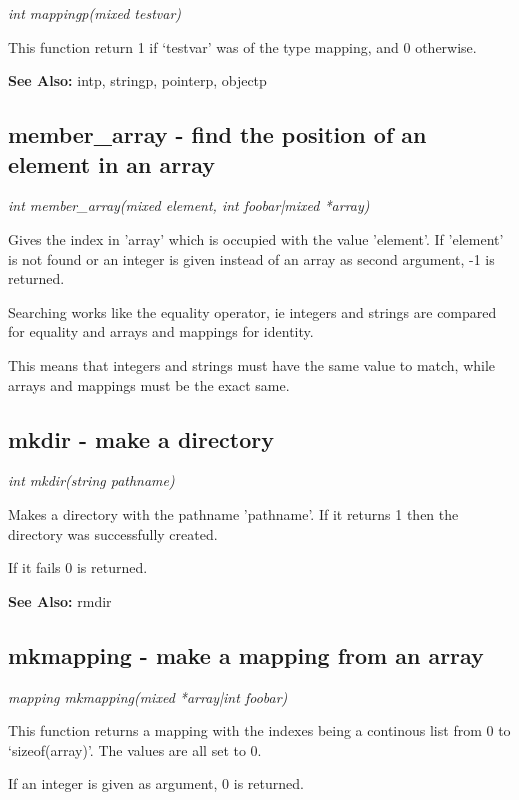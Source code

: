     {\em int mappingp(mixed testvar)}

    This function return 1 if `testvar' was of the type mapping,
    and 0 otherwise.

    {\bf See Also: }    intp, stringp, pointerp, objectp



\subsection{member\_array - find the position of an element in an array}

    {\em int member\_array(mixed element, int foobar|mixed *array)}

    Gives the index in 'array' which is occupied with the value 'element'.
    If 'element' is not found or an integer is given instead of an array
    as second argument, -1 is returned.

    Searching works like the equality operator, ie integers and strings
    are compared for equality and arrays and mappings for identity.

    This means that integers and strings must have the same value to match,
    while arrays and mappings must be the exact same.



\subsection{mkdir - make a directory}

    {\em int mkdir(string pathname)}

    Makes a directory with the pathname 'pathname'. If it returns 1 then
    the directory was successfully created.

    If it fails 0 is returned.

    {\bf See Also: }    rmdir



\subsection{mkmapping - make a mapping from an array}

    {\em mapping mkmapping(mixed *array|int foobar)}

    This function returns a mapping with the indexes being a
    continous list from 0 to `sizeof(array)'. The values are
    all set to 0.

    If an integer is given as argument, 0 is returned.

